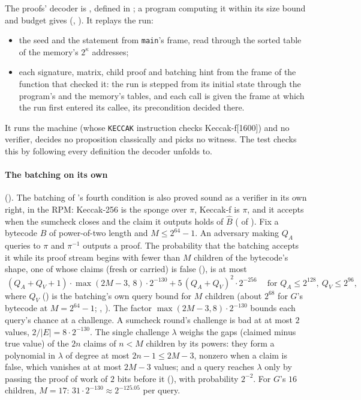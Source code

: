 \documentclass[11pt]{article}
\begin{document}
The proofs' decoder is , defined in ; a program
computing it within its size bound and budget gives 
(, ). It replays the run:
\begin{itemize}
\item the seed and the statement from \texttt{main}'s frame, read through the sorted table of the
memory's $2^\kappa$ addresses;
\item each signature, matrix, child proof and batching hint from the frame of the function that
checked it: the run is stepped from its initial state through the program's and the memory's
tables, and each call is given the frame at which the run first entered its callee, its
precondition decided there.
\end{itemize}
It runs the machine (whose \texttt{KECCAK} instruction checks Keccak-f[1600]) and no verifier,
decides no proposition classically and picks no witness. The test
 checks this by following every definition the decoder
unfolds to.

\paragraph{The batching on its own} (). The batching of 's fourth
condition is also proved sound as a verifier in its own right, in the RPM: Keccak-256 is the sponge
over $\pi$, Keccak-f is $\pi$, and it accepts when the sumcheck closes and the claim it outputs
holds of $\widehat{B}$ ( of ). Fix a bytecode $B$ of power-of-two
length and $M \le 2^{64}-1$. An adversary making $Q_A$ queries to $\pi$ and $\pi^{-1}$ outputs a
proof. The probability that the batching accepts it while its proof stream begins with fewer than
$M$ children of the bytecode's shape, one of whose claims (fresh or carried) is false
(), is at most
\[
\boxed{\ (Q_A + Q_V + 1)\cdot \max(2M-3,\,8)\cdot 2^{-130} + 5\,(Q_A+Q_V)^2\cdot 2^{-256}\ }
\quad\text{for } Q_A \le 2^{128},\ Q_V \le 2^{96},
\]
where $Q_V$ () is the batching's own query bound for $M$ children (about
$2^{68}$ for $G$'s bytecode at $M = 2^{64}-1$; , ). The factor $\max(2M-3, 8)\cdot 2^{-130}$ bounds each query's chance at a challenge. A sumcheck round's challenge is bad at at most $2$ values, $2/|E| = 8\cdot 2^{-130}$. The single challenge $\lambda$ weighs the gaps (claimed minus true value) of the $2n$ claims of $n < M$ children by its powers: they form a polynomial in $\lambda$ of degree at most $2n-1 \le 2M-3$, nonzero when a claim is false, which vanishes at at most $2M-3$ values; and a query reaches $\lambda$ only by passing the proof of work of $2$ bits before it (), with probability $2^{-2}$. For $G$'s $16$ children, $M = 17$: $31\cdot 2^{-130} \approx 2^{-125.05}$ per query.
\end{document}
